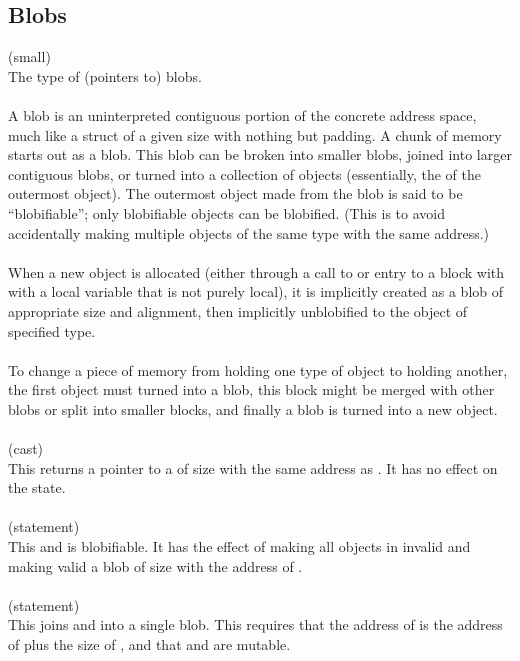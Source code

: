 \documentclass[preprint,nocopyrightspace]{sigplanconf}
\begin{document}
{{{\subsection{Blobs}
\vcc{\blob} (small)\\
The type of (pointers to) blobs. 
\\\\
A blob is an uninterpreted contiguous portion of the concrete address
space, much like a struct of a given size with nothing but padding. 
A chunk of memory starts out as a blob. This blob can be broken into
smaller blobs, joined into larger contiguous blobs, or turned into a
collection of objects (essentially, the \vcc{\extent} of the outermost
object). The outermost object made from the blob is said to be
``blobifiable''; only blobifiable objects can be blobified. (This is
to avoid accidentally making multiple objects of the same type with
the same address.) 
\\\\
When a new object is allocated (either through a call to  or
entry to a block with with a local variable that is not purely local),
it is implicitly created as a blob of appropriate size and alignment,
then implicitly unblobified to the object of specified type.
\\\\
To change a piece of memory from holding one type of object to holding
another, the first object must turned into a blob, this block might be 
merged with other blobs or split into smaller blocks, and finally a blob
is turned into a new object. 
\\\\
 (cast)\\
This returns a pointer to a  of size  with the same
address as . It has no effect on the state. 
\\\\
 (statement)\\
This    and
 is blobifiable. It has the effect of making all
objects in  invalid and making valid a blob of
size  with the address of .
\\\\ 
 (statement)\\
This joins  and  into a single blob. This requires that
the address of  is the address of  plus the size
of , and that  and  are mutable.
}}}
\end{document}

